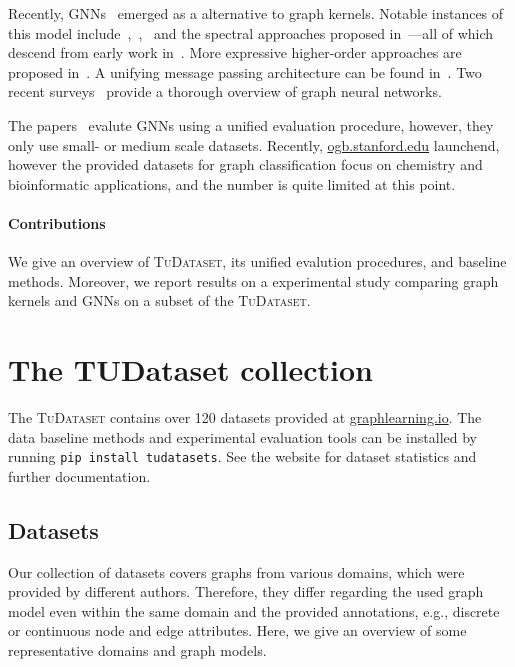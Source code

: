\documentclass{article}
\theoremstyle{definition}
\begin{document}
Recently, GNNs~\cite{Gil+2017} emerged as a alternative to graph kernels. Notable instances of this model include~\cite{Duv+2015},~\cite{Li+2016},~\cite{Ham+2017} and the spectral approaches proposed in~\cite{Bru+2014,Def+2015,Kip+2017}---all of which descend from early work in~\cite{Kir+1995,Mer+2005,Sca+2009}. More expressive higher-order approaches are proposed in~\cite{Mor+2019,Mar+2019}. A unifying message passing architecture can be found in~\cite{Gil+2017}. Two recent surveys~\cite{wu2019comprehensive,zhou2018graph} provide a thorough overview of graph neural networks.

The papers~\cite{Fey+2019,Err+2019,Dwi+2020} evalute GNNs using a unified evaluation procedure, however, they only use small- or medium scale datasets. Recently, \url{ogb.stanford.edu} launchend, however the provided datasets for graph classification focus on chemistry and bioinformatic applications, and the number is quite limited at this point.

\paragraph{Contributions} We give an overview of \textsc{TuDataset}, its unified evalution procedures, and baseline methods. Moreover, we report results on a experimental study comparing graph kernels and GNNs on a subset of the \textsc{TuDataset}.

\section{The TUDataset collection}

The \textsc{TuDataset} contains over 120 datasets provided at \url{graphlearning.io}. The data  baseline methods and experimental evaluation tools can be installed by running \texttt{pip install tudatasets}. See the website for dataset statistics and further documentation.

\subsection{Datasets}

Our collection of datasets covers graphs from various domains, which were provided by different authors. Therefore, they differ regarding the used graph model even within the same domain and the provided annotations, e.g., discrete or continuous node and edge attributes. Here, we give an overview of some representative domains and graph models.
\end{document}
